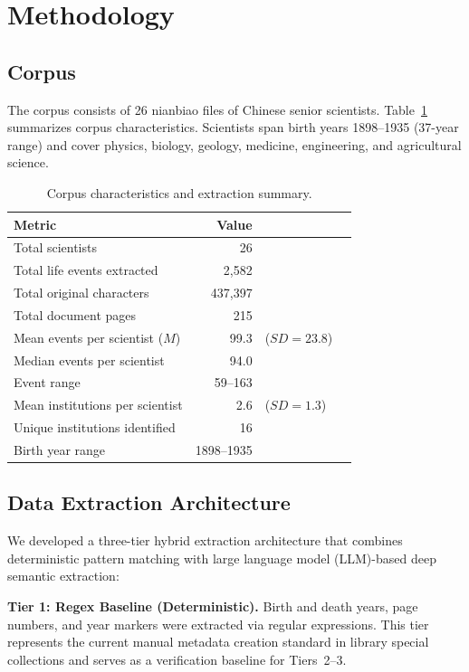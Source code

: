 \documentclass[review]{elsarticle}
\begin{document}
\section{Methodology}

\subsection{Corpus}

The corpus consists of 26 nianbiao files of Chinese senior scientists. Table~\ref{tab:corpus} summarizes corpus characteristics. Scientists span birth years 1898--1935 (37-year range) and cover physics, biology, geology, medicine, engineering, and agricultural science.

\begin{table}[ht]
\centering
\caption{Corpus characteristics and extraction summary.}
\label{tab:corpus}
\begin{tabular}{lrlr}
\toprule
Metric & Value & & \\
\midrule
Total scientists & 26 &  \\
Total life events extracted & 2,582 &  \\
Total original characters & 437,397 &  \\
Total document pages & 215 &  \\
Mean events per scientist ($M$) & 99.3 & ($SD = 23.8$) \\
Median events per scientist & 94.0 &  \\
Event range & 59--163 &  \\
Mean institutions per scientist & 2.6 & ($SD = 1.3$) \\
Unique institutions identified & 16 &  \\
Birth year range & 1898--1935 &  \\
\bottomrule
\end{tabular}
\end{table}

\subsection{Data Extraction Architecture}

We developed a three-tier hybrid extraction architecture that combines deterministic pattern matching with large language model (LLM)-based deep semantic extraction:

\textbf{Tier 1: Regex Baseline (Deterministic).} Birth and death years, page numbers, and year markers were extracted via regular expressions. This tier represents the current manual metadata creation standard in library special collections and serves as a verification baseline for Tiers~2--3.
\end{document}
